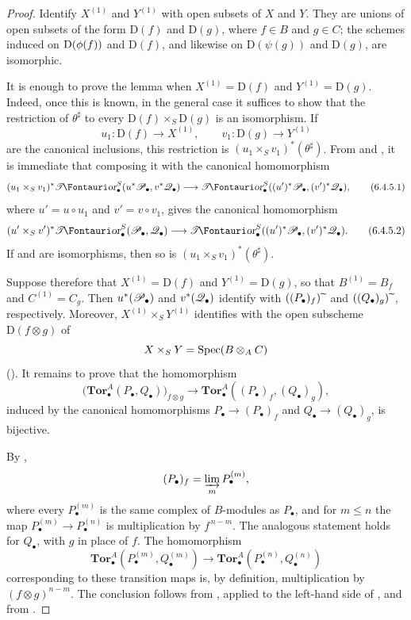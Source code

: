 \begin{proof}
Identify $X^{(1)}$ and $Y^{(1)}$ with open subsets of $X$ and $Y$.
They are unions of open subsets of the form $\mathrm D(f)$ and
$\mathrm D(g)$, where $f\in B$ and $g\in C$; the schemes induced
on $\mathrm D(\phi(f))$ and $\mathrm D(f)$, and likewise on
$\mathrm D(\psi(g))$ and $\mathrm D(g)$, are isomorphic.

It is enough to prove the lemma when
$X^{(1)}=\mathrm D(f)$ and $Y^{(1)}=\mathrm D(g)$.  Indeed, once
this is known, in the general case it suffices to show that the
restriction of $\theta^\sharp$ to every
$\mathrm D(f)\times_S\mathrm D(g)$ is an isomorphism.  If
\[
  u_1:\mathrm D(f)\longrightarrow X^{(1)},
  \qquad
  v_1:\mathrm D(g)\longrightarrow Y^{(1)}
\]
are the canonical inclusions, this restriction is
$(u_1\times_Sv_1)^*(\theta^\sharp)$.  From
 and , it is immediate that
composing it with the canonical homomorphism
\[
  (u_1\times_Sv_1)^*
  \shTor_\bullet^S(u^*\sh P_\bullet,v^*\sh Q_\bullet)
  \longrightarrow
  \shTor_\bullet^S((u')^*\sh P_\bullet,(v')^*\sh Q_\bullet),
  \tag{6.4.5.1}\label{III.6.4.5.1}
\]
where $u'=u\circ u_1$ and $v'=v\circ v_1$, gives the canonical
homomorphism
\[
  (u'\times_Sv')^*
  \shTor_\bullet^S(\sh P_\bullet,\sh Q_\bullet)
  \longrightarrow
  \shTor_\bullet^S((u')^*\sh P_\bullet,(v')^*\sh Q_\bullet).
  \tag{6.4.5.2}\label{III.6.4.5.2}
\]
If  and  are isomorphisms,
then so is $(u_1\times_Sv_1)^*(\theta^\sharp)$.

Suppose therefore that $X^{(1)}=\mathrm D(f)$ and
$Y^{(1)}=\mathrm D(g)$, so that $B^{(1)}=B_f$ and
$C^{(1)}=C_g$.  Then $u^*(\mathscr{P}_\bullet)$ and
$v^*(\mathscr{Q}_\bullet)$ identify with
$((P_\bullet)_f){\,\widetilde{\,}\,}$ and
$((Q_\bullet)_g){\,\widetilde{\,}\,}$, respectively.  Moreover,
$X^{(1)}\times_SY^{(1)}$ identifies with the open subscheme
$\mathrm D(f\otimes g)$ of
\[
  X\times_SY=\operatorname{Spec}(B\otimes_AC)
\]
().  It remains to prove that the
homomorphism
\[
  \bigl(\mathbf{Tor}_\bullet^A(P_\bullet,Q_\bullet)\bigr)_{f\otimes g}
  \longrightarrow
  \mathbf{Tor}_\bullet^A((P_\bullet)_f,(Q_\bullet)_g),
  \tag{6.4.5.3}\label{III.6.4.5.3}
\]
induced by the canonical homomorphisms
$P_\bullet\longrightarrow(P_\bullet)_f$ and
$Q_\bullet\longrightarrow(Q_\bullet)_g$, is bijective.

By ,
\[
  (P_\bullet)_f=\varinjlim_m P_\bullet^{(m)},
\]
where every $P_\bullet^{(m)}$ is the same complex of $B$-modules
as $P_\bullet$, and for $m\leq n$ the map
$P_\bullet^{(m)}\longrightarrow P_\bullet^{(n)}$ is
multiplication by $f^{\,n-m}$.  The analogous statement holds for
$Q_\bullet$, with $g$ in place of $f$.  The homomorphism
\[
  \mathbf{Tor}_\bullet^A(P_\bullet^{(m)},Q_\bullet^{(m)})
  \longrightarrow
  \mathbf{Tor}_\bullet^A(P_\bullet^{(n)},Q_\bullet^{(n)})
\]
corresponding to these transition maps is, by definition,
multiplication by $(f\otimes g)^{n-m}$.  The conclusion follows
from , applied to the left-hand side of
, and from .
\end{proof}

